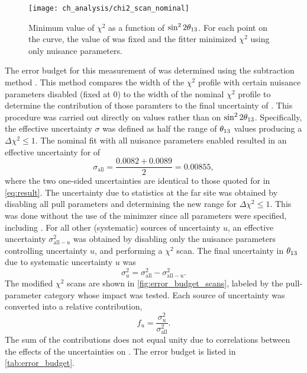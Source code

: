 \begin{figure}
    \centering
    \texttt{[image: ch\_analysis/chi2\_scan\_nominal]}
    \caption[$\chi^2$ scan]{
        Minimum value of $\chi^2$ as a function of $\sin^22\theta_{13}$.
        For each point on the curve, the value of \thetaot{} was fixed
        and the fitter minimized $\chi^2$
        using only nuisance parameters.
    }
    \label{fig:chi2_scan}
\end{figure}

The error budget for this measurement of \thetaot{}
was determined using the subtraction method \cite{nh2016technote}.
This method compares the width of the $\chi^2$ profile
with certain nuisance parameters disabled (fixed at 0)
to the width of the nominal $\chi^2$ profile
to determine the contribution of those paramters
to the final uncertainty of \thetaot{}.
This procedure was carried out directly on \thetaot{} values
rather than on $\sin^22\theta_{13}$.
Specifically, the effective uncertainty $\sigma$
was defined as half the range of $\theta_{13}$ values
producing a $\Delta \chi^2 \leq 1$.
The nominal fit with all nuisance parameters enabled
resulted in an effective uncertainty for \thetaot{} of
\begin{equation}\label{eq:nominal_unc}
    \sigma_\text{all} = \frac{0.0082 + 0.0089}{2} = 0.00855,
\end{equation}
where the two one-sided uncertainties are identical
to those quoted for \thetaot{} in \cref{eq:result}.
The uncertainty due to statistics at the far site was obtained
by disabling all pull parameters
and determining the new range for $\Delta \chi^2 \leq 1$.
This was done without the use of the minimzer since all parameters were specified,
including \thetaot{}.
For all other (systematic) sources of uncertainty $u$,
an effective uncertainty $\sigma^2_{\text{all}-u}$
was obtained by disabling only the nuisance parameters
controlling uncertainty $u$,
and performing a $\chi^2$ scan.
The final uncertainty in $\theta_{13}$ due to
systematic uncertainty $u$ was
\begin{equation}\label{eq:syst_error_budget}
    \sigma^2_u = \sigma^2_\text{all} - \sigma^2_{\text{all}-u}.
\end{equation}
The modified $\chi^2$ scans are shown in \cref{fig:error_budget_scans},
labeled by the pull-parameter category whose impact was tested.
Each source of uncertainty was converted into a relative contribution,
\begin{equation}\label{eq:syst_error_rel}
    f_u = \frac{\sigma^2_u}{\sigma^2_{\text{all}}}.
\end{equation}
The sum of the contributions does not equal unity
due to correlations between the effects of the uncertainties
on \thetaot{}.
The error budget is
listed in \cref{tab:error_budget}.


